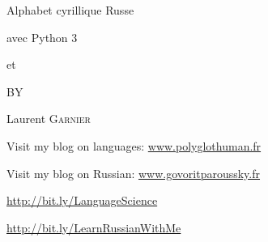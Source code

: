 \documentclass[12pt,a4paper]{article}
\author{Laurent Garnier}
\date{}
\begin{document}
\begin{titlepage}

\begin{center}

{\Large {\sc Alphabet cyrillique Russe\par avec Python 3\par et \XeLaTeX} \par}
\vspace{2cm}
\end{center}
\newpage

\vspace{2cm}

\begin{center}

BY

{\Large Laurent \textsc{Garnier} \par}

\vspace{2cm}
{\sc Visit my blog on languages:}
 \url{www.polyglothuman.fr}\par
{\sc Visit my blog on Russian:}
 \url{www.govoritparoussky.fr}\par

\end{center}
\newpage

\begin{center}
\url{http://bit.ly/LanguageScience}\par
\url{http://bit.ly/LearnRussianWithMe}\par

\end{center}

\end{titlepage}

\tableofcontents
\end{document}
